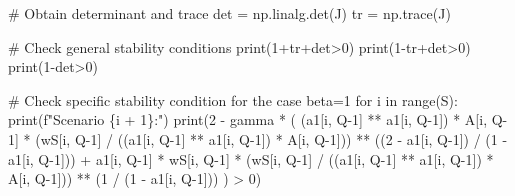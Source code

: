 \documentclass[
  letterpaper,
  DIV=11,
  numbers=noendperiod]{scrreprt}
\newenvironment{Shaded}{\begin{snugshade}}{\end{snugshade}}
\newcommand{\BuiltInTok}[1]{\textcolor[rgb]{0.00,0.23,0.31}{#1}}
\newcommand{\CommentTok}[1]{\textcolor[rgb]{0.37,0.37,0.37}{#1}}
\newcommand{\ControlFlowTok}[1]{\textcolor[rgb]{0.00,0.23,0.31}{#1}}
\newcommand{\DecValTok}[1]{\textcolor[rgb]{0.68,0.00,0.00}{#1}}
\newcommand{\KeywordTok}[1]{\textcolor[rgb]{0.00,0.23,0.31}{#1}}
\newcommand{\NormalTok}[1]{\textcolor[rgb]{0.00,0.23,0.31}{#1}}
\newcommand{\OperatorTok}[1]{\textcolor[rgb]{0.37,0.37,0.37}{#1}}
\newcommand{\SpecialCharTok}[1]{\textcolor[rgb]{0.37,0.37,0.37}{#1}}
\newcommand{\SpecialStringTok}[1]{\textcolor[rgb]{0.13,0.47,0.30}{#1}}
\begin{document}
\begin{tcolorbox}
\begin{Shaded}
\begin{Highlighting}[]
\CommentTok{\# Obtain determinant and trace}
\NormalTok{det }\OperatorTok{=}\NormalTok{ np.linalg.det(J)}
\NormalTok{tr }\OperatorTok{=}\NormalTok{ np.trace(J)}

\CommentTok{\# Check general stability conditions}
\BuiltInTok{print}\NormalTok{(}\DecValTok{1}\OperatorTok{+}\NormalTok{tr}\OperatorTok{+}\NormalTok{det}\OperatorTok{\textgreater{}}\DecValTok{0}\NormalTok{)}
\BuiltInTok{print}\NormalTok{(}\DecValTok{1}\OperatorTok{{-}}\NormalTok{tr}\OperatorTok{+}\NormalTok{det}\OperatorTok{\textgreater{}}\DecValTok{0}\NormalTok{)}
\BuiltInTok{print}\NormalTok{(}\DecValTok{1}\OperatorTok{{-}}\NormalTok{det}\OperatorTok{\textgreater{}}\DecValTok{0}\NormalTok{)}

\CommentTok{\# Check specific stability condition for the case beta=1}
\ControlFlowTok{for}\NormalTok{ i }\KeywordTok{in} \BuiltInTok{range}\NormalTok{(S):}
    \BuiltInTok{print}\NormalTok{(}\SpecialStringTok{f"Scenario }\SpecialCharTok{\{}\NormalTok{i }\OperatorTok{+} \DecValTok{1}\SpecialCharTok{\}}\SpecialStringTok{:"}\NormalTok{)}
    \BuiltInTok{print}\NormalTok{(}\DecValTok{2} \OperatorTok{{-}}\NormalTok{ gamma }\OperatorTok{*}\NormalTok{ (}
\NormalTok{        (a1[i, Q}\OperatorTok{{-}}\DecValTok{1}\NormalTok{] }\OperatorTok{**}\NormalTok{ a1[i, Q}\OperatorTok{{-}}\DecValTok{1}\NormalTok{]) }\OperatorTok{*}\NormalTok{ A[i, Q}\OperatorTok{{-}}\DecValTok{1}\NormalTok{] }\OperatorTok{*} 
\NormalTok{        (wS[i, Q}\OperatorTok{{-}}\DecValTok{1}\NormalTok{] }\OperatorTok{/}\NormalTok{ ((a1[i, Q}\OperatorTok{{-}}\DecValTok{1}\NormalTok{] }\OperatorTok{**}\NormalTok{ a1[i, Q}\OperatorTok{{-}}\DecValTok{1}\NormalTok{]) }\OperatorTok{*}\NormalTok{ A[i, Q}\OperatorTok{{-}}\DecValTok{1}\NormalTok{])) }\OperatorTok{**}\NormalTok{ ((}\DecValTok{2} \OperatorTok{{-}}\NormalTok{ a1[i, Q}\OperatorTok{{-}}\DecValTok{1}\NormalTok{]) }\OperatorTok{/}\NormalTok{ (}\DecValTok{1} \OperatorTok{{-}}\NormalTok{ a1[i, Q}\OperatorTok{{-}}\DecValTok{1}\NormalTok{])) }\OperatorTok{+}
\NormalTok{        a1[i, Q}\OperatorTok{{-}}\DecValTok{1}\NormalTok{] }\OperatorTok{*}\NormalTok{ wS[i, Q}\OperatorTok{{-}}\DecValTok{1}\NormalTok{] }\OperatorTok{*}\NormalTok{ (wS[i, Q}\OperatorTok{{-}}\DecValTok{1}\NormalTok{] }\OperatorTok{/}\NormalTok{ ((a1[i, Q}\OperatorTok{{-}}\DecValTok{1}\NormalTok{] }\OperatorTok{**}\NormalTok{ a1[i, Q}\OperatorTok{{-}}\DecValTok{1}\NormalTok{]) }\OperatorTok{*}\NormalTok{ A[i, Q}\OperatorTok{{-}}\DecValTok{1}\NormalTok{])) }\OperatorTok{**}\NormalTok{ (}\DecValTok{1} \OperatorTok{/}\NormalTok{ (}\DecValTok{1} \OperatorTok{{-}}\NormalTok{ a1[i, Q}\OperatorTok{{-}}\DecValTok{1}\NormalTok{]))}
\NormalTok{    ) }\OperatorTok{\textgreater{}} \DecValTok{0}\NormalTok{)}
\end{Highlighting}
\end{Shaded}

\end{tcolorbox}
\end{document}
